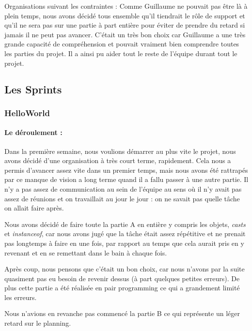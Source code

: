 \documentclass[a4paper, 12pt]{article}
\newcommand{\nom}[1]{\emph{#1}}
\begin{document}
Organisations suivant les contraintes : Comme Guillaume ne pouvait pas
être là à plein temps, nous avons décidé tous ensemble qu’il tiendrait le rôle
de support et qu’il ne sera pas sur une partie à part entière pour
éviter de prendre du retard si jamais il ne peut pas avancer. C’était
un très bon choix car Guillaume a une très grande capacité de
compréhension et pouvait vraiment bien comprendre toutes les parties
du projet. Il a ainsi pu aider tout le reste de l’équipe durant tout
le projet.


\subsection{Les Sprints}

\subsubsection{HelloWorld}

\paragraph*{Le déroulement :}
Dans la première semaine, nous voulions démarrer au plus vite le projet,
nous avons décidé d'une organisation à très court terme, rapidement.
Cela nous a permis d'avancer assez vite dans un premier temps, mais
nous avons été rattrapés par ce manque de vision a long terme quand il
a fallu passer à une autre partie. Il n'y a pas assez de communication
au sein de l'équipe au sens où il n'y avait pas assez de réunions et on
travaillait au jour le jour : on ne savait pas quelle tâche on allait
faire après.

Nous avons décidé de faire toute la partie A en entière y compris les
objets, \nom{casts} et \nom{instanceof}, car nous avons jugé que la
tâche était assez répétitive et ne prenait pas longtemps à faire en
une fois, par rapport au temps que cela aurait pris en y revenant
et en se remettant dans le bain à chaque fois.

Après coup, nous pensons que c'était un bon choix, car nous n'avons
par la suite quasiment pas eu besoin de revenir dessus (à part quelques
petites erreurs). De plus cette partie a été réalisée en pair programming
ce qui a grandement limité les erreurs.

Nous n'avions en revanche pas commencé la partie B ce qui représente un
léger retard sur le planning.
\end{document}

